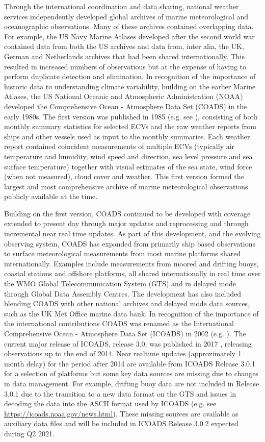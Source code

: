 Through the international coordination and data sharing, national weather services independently developed global archives of marine meteorological and oceanographic observations.
Many of these archives contained overlapping data. 
For example, the US Navy Marine Atlases developed after the second world war contained data from both the US archives and data from, inter alia, the UK, German and Netherlands archives that had been shared internationally. 
This resulted in increased numbers of observations but at the expense of having to perform duplicate detection and elimination.
In recognition of the importance of historic data to understanding climate variability, building on the earlier Marine Atlases, the US National Oceanic and Atmospheric Administration (NOAA) developed the Comprehensive Ocean - Atmosphere Data Set (COADS) in the early 1980s.
The first version was published in 1985 (e.g. see \cite{Woodruff1987}), consisting of both monthly summary statistics for selected ECVs and the raw weather reports from ships and other vessels used as input to the monthly summaries.
Each weather report contained coincident measurements of multiple ECVs (typically air temperature and humidity, wind speed and direction, sea level pressure and sea surface temperature) together with visual estimates of the sea state, wind force (when not measured), cloud cover and weather. 
This first version formed the largest and most comprehensive archive of marine meteorological observations publicly available at the time. 

Building on the first version, COADS continued to be developed with coverage extended to present day through major updates and reprocessing and through incremental near real time updates. 
As part of this development, and the evolving observing system, COADS has expanded from primarily ship based observations to surface meteorological measurements from most marine platforms shared internationally.
Examples include measurements from moored and drifting buoys, coastal stations and offshore platforms, all shared internationally in real time over the WMO Global Telecommunication System (GTS) and in delayed mode through Global Data Assembly Centres.
The development has also included blending COADS with other national archives and delayed mode data sources, such as the UK Met Office marine data bank.
In recognition of the importance of the international contributions COADS was renamed as the International Comprehensive Ocean - Atmosphere Data Set (ICOADS) in 2002 (e.g. \cite{Worley2005}). 
The current major release of ICOADS, release 3.0, was published in 2017 \cite{Freeman2017}, releasing observations up to the end of 2014.
Near realtime updates (approximately 1 month delay) for the period after 2014 are available from ICOADS Release 3.0.1 for a selection of platforms but some key data sources are missing due to changes in data management.
For example, drifting buoy data are not included in Release 3.0.1 due to the transition to a new data format on the GTS and issues in decoding the data into the ASCII format used by ICOADS (e.g. see \url{https://icoads.noaa.gov/news.html}).
These missing sources are available as auxiliary data files and will be included in ICOADS Release 3.0.2 expected during Q2 2021. 

